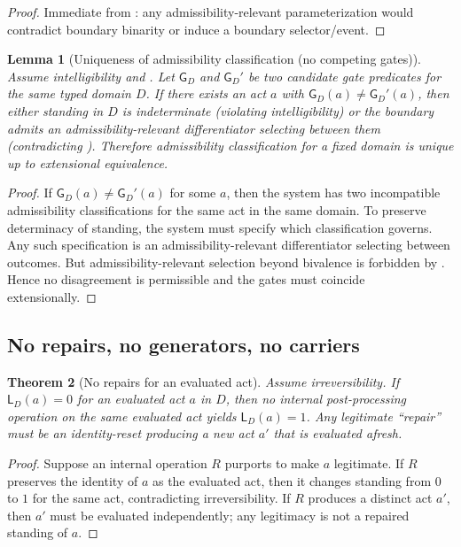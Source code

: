 \documentclass[11pt]{article}
\newtheorem{theorem}{Theorem}[section]
\newtheorem{lemma}[theorem]{Lemma}
\theoremstyle{definition}
\newcommand{\Gate}{\mathsf{G}}
\newcommand{\Stand}{\mathsf{L}}
\begin{document}
\begin{proof}
Immediate from : any admissibility-relevant parameterization would contradict boundary binarity or induce a boundary selector/event.
\end{proof}

\begin{lemma}[Uniqueness of admissibility classification (no competing gates)]
\label{lem:no-competing-gates}
Assume intelligibility and .
Let $\Gate_D$ and $\Gate_D'$ be two candidate gate predicates for the same typed domain $D$.
If there exists an act $a$ with $\Gate_D(a)\neq \Gate_D'(a)$, then either standing in $D$ is indeterminate (violating intelligibility) or the boundary admits an admissibility-relevant differentiator selecting between them (contradicting ).
Therefore admissibility classification for a fixed domain is unique up to extensional equivalence.
\end{lemma}

\begin{proof}
If $\Gate_D(a)\neq \Gate_D'(a)$ for some $a$, then the system has two incompatible admissibility classifications for the same act in the same domain.
To preserve determinacy of standing, the system must specify which classification governs.
Any such specification is an admissibility-relevant differentiator selecting between outcomes.
But admissibility-relevant selection beyond bivalence is forbidden by .
Hence no disagreement is permissible and the gates must coincide extensionally.
\end{proof}

\subsection{No repairs, no generators, no carriers}

\begin{theorem}[No repairs for an evaluated act]
\label{thm:no-repairs}
Assume irreversibility.
If $\Stand_D(a)=0$ for an evaluated act $a$ in $D$, then no internal post-processing operation on the \emph{same evaluated act} yields $\Stand_D(a)=1$.
Any legitimate ``repair'' must be an identity-reset producing a new act $a'$ that is evaluated afresh.
\end{theorem}

\begin{proof}
Suppose an internal operation $R$ purports to make $a$ legitimate.
If $R$ preserves the identity of $a$ as the evaluated act, then it changes standing from $0$ to $1$ for the same act, contradicting irreversibility.
If $R$ produces a distinct act $a'$, then $a'$ must be evaluated independently; any legitimacy is not a repaired standing of $a$.
\end{proof}
\end{document}
